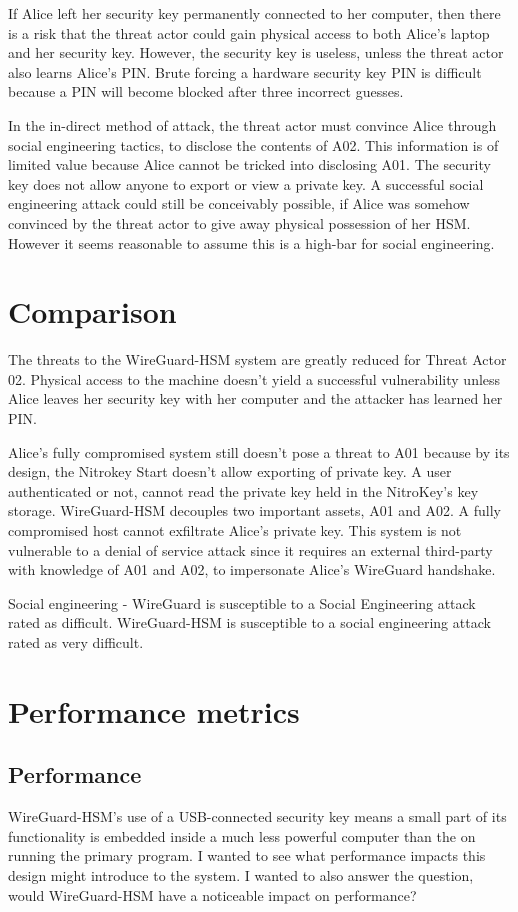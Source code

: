 \documentclass [11pt, proquest] {uwthesis}[2020/02/24]
\begin{document}
If Alice left her security key permanently connected to her computer, then there is a risk that the threat actor could gain physical access to both Alice's laptop and her security key. However, the security key is useless, unless the threat actor also learns Alice's PIN. Brute forcing a hardware security key PIN is difficult because a PIN will become blocked after three incorrect guesses.

In the in-direct method of attack, the threat actor must convince Alice through social engineering tactics, to disclose the contents of A02. This information is of limited value because Alice cannot be tricked into disclosing A01. The security key does not allow anyone to export or view a private key.
A successful social engineering attack could still be conceivably possible, if Alice was somehow convinced by the threat actor to give away physical possession of her HSM. However it seems reasonable to assume this is a high-bar for social engineering.


\section{Comparison}
The threats to the WireGuard-HSM system are greatly reduced for Threat Actor 02. Physical access to the machine doesn't yield a successful vulnerability unless Alice leaves her security key with her computer and the attacker has learned her PIN.

Alice's fully compromised system still doesn't pose a threat to A01 because by its design, the Nitrokey Start doesn't allow exporting of private key. A user authenticated or not, cannot read the private key held in the NitroKey's key storage.
WireGuard-HSM decouples two important assets, A01 and A02. A fully compromised host cannot exfiltrate Alice's private key. This system is not vulnerable to a denial of service attack since it requires an external third-party with knowledge of A01 and A02, to impersonate Alice's WireGuard handshake.

Social engineering - 
WireGuard is susceptible to a Social Engineering attack rated as difficult.
WireGuard-HSM is susceptible to a social engineering attack rated as very difficult.  



\section{Performance metrics}

\subsection{Performance}
\label{performance}
WireGuard-HSM's use of a USB-connected security key means a small part of its functionality is embedded inside a much less powerful computer than the on running the primary program. I wanted to see what performance impacts this design might introduce to the system. I wanted to also answer the question, would WireGuard-HSM have a noticeable impact on performance?
\end{document}
